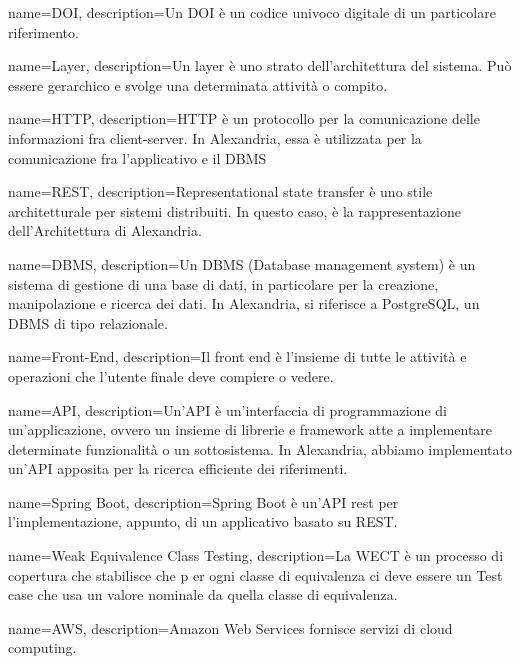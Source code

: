 {
    name={DOI},
    description={Un DOI è un codice univoco digitale di un particolare riferimento.}
}

{
    name={Layer},
    description={Un layer è uno strato dell'architettura del sistema. Può essere gerarchico e svolge una determinata attività o compito.}
}

{
    name={HTTP},
    description={HTTP è un protocollo per la comunicazione delle informazioni fra client-server. In Alexandria, essa è utilizzata per la comunicazione fra l'applicativo e il DBMS}
}

{
    name={REST},
    description={Representational state transfer è uno stile architetturale per sistemi distribuiti. In questo caso, è la rappresentazione dell'Architettura di Alexandria.}
}

{
    name={DBMS},
    description={Un DBMS (Database management system) è un sistema di gestione di una base di dati, in particolare per la creazione, manipolazione e ricerca dei dati. In Alexandria, si riferisce a PostgreSQL, un DBMS di tipo relazionale.}
}


{
    name={Front-End},
    description={Il front end è l'insieme di tutte le attività e operazioni che l'utente finale deve compiere o vedere.}
}

{
    name={API},
    description={Un'API è un'interfaccia di programmazione di un'applicazione, ovvero un insieme di librerie e framework atte a implementare determinate funzionalità o un sottosistema. In Alexandria, abbiamo implementato un'API apposita per la ricerca efficiente dei riferimenti.}
}

{
    name={Spring Boot},
    description={Spring Boot è un'API rest per l'implementazione, appunto, di un applicativo basato su REST.}
}

{
    name={Weak Equivalence Class Testing},
    description={La WECT è un processo di copertura che stabilisce che p er ogni classe di equivalenza
ci deve essere un Test case che usa un valore nominale da quella classe
di equivalenza.}
}

{
    name={AWS},
    description={Amazon Web Services fornisce servizi di cloud computing.}
}

\printglossaries

